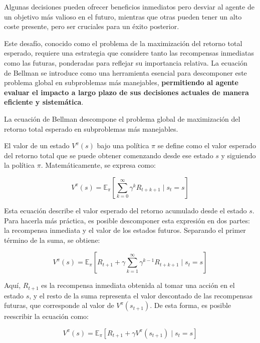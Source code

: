 \documentclass[a4paper,12pt]{report}
\begin{document}
Algunas decisiones pueden ofrecer beneficios inmediatos pero desviar al agente de un objetivo 
más valioso en el futuro, mientras que otras pueden tener un alto coste presente, pero ser 
cruciales para un éxito posterior.

Este desafío, conocido como el problema de la maximización del retorno total esperado, 
requiere una estrategia que considere tanto las recompensas inmediatas como las futuras, 
ponderadas para reflejar su importancia relativa. La ecuación de Bellman se introduce como 
una herramienta esencial para descomponer este problema global en subproblemas más manejables, 
\textbf{permitiendo al agente evaluar el impacto a largo plazo de sus decisiones actuales de 
manera eficiente y sistemática}.

La ecuación de Bellman descompone el problema global de maximización del retorno total 
esperado en subproblemas más manejables. 

El valor de un estado \(V^\pi(s)\) bajo una política \(\pi\) se define como el valor esperado 
del retorno total que se puede obtener comenzando desde ese estado \(s\) y siguiendo la política 
\(\pi\). Matemáticamente, se expresa como:

\begin{equation}
V^\pi(s) = \mathbb{E}_\pi \left[ \sum_{k=0}^{\infty} \gamma^k R_{t+k+1} \mid s_t = s \right]
\end{equation}

Esta ecuación describe el valor esperado del retorno acumulado desde el estado \(s\). 
Para hacerla más práctica, es posible descomponer esta expresión en dos partes: la 
recompensa inmediata y el valor de los estados futuros. Separando el primer término de 
la suma, se obtiene:

\begin{equation}
V^\pi(s) = \mathbb{E}_\pi \left[ R_{t+1} + \gamma \sum_{k=1}^{\infty} \gamma^{k-1} R_{t+k+1} \mid s_t = s \right]
\end{equation}

Aquí, \(R_{t+1}\) es la recompensa inmediata obtenida al tomar una acción en el estado \(s\), 
y el resto de la suma representa el valor descontado de las recompensas futuras, que 
corresponde al valor de \(V^\pi(s_{t+1})\). De esta forma, es posible reescribir la ecuación como:

\begin{equation}
V^\pi(s) = \mathbb{E}_\pi \left[ R_{t+1} + \gamma V^\pi(s_{t+1}) \mid s_t = s \right]
\end{equation}
\end{document}
